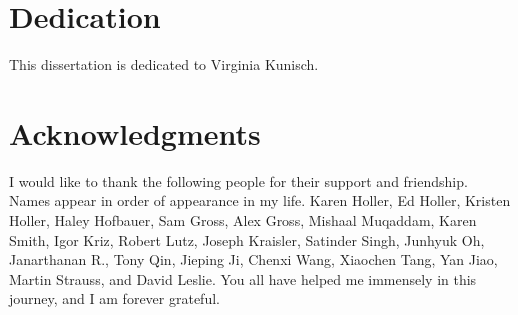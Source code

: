 \section*{Dedication}


\begin{center}
This dissertation is dedicated to Virginia Kunisch.
\end{center}
\restoregeometry

\newpage
{}
\section*{Acknowledgments}
\onehalfspacing
I would like to thank the following people for their support and friendship. Names appear in order of appearance in my life. Karen Holler, Ed Holler, Kristen Holler, Haley Hofbauer, Sam Gross, Alex Gross, Mishaal Muqaddam, Karen Smith, Igor Kriz, Robert Lutz, Joseph Kraisler, Satinder Singh, Junhyuk Oh, Janarthanan R., Tony Qin, Jieping Ji, Chenxi Wang, Xiaochen Tang, Yan Jiao, Martin Strauss, and David Leslie. You all have helped me immensely in this journey, and I am forever grateful.
\restoregeometry

\newpage


\tableofcontents
{%
\let\oldnumberline\numberline%
\renewcommand{\numberline}{\figurename~\oldnumberline}%
\newpage
{}
\begin{center}
\listoffigures%
\end{center}
}

